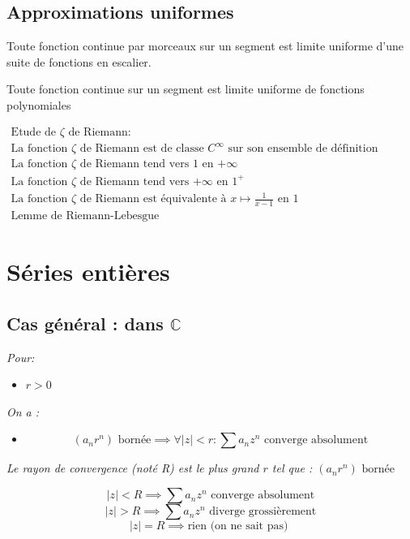 \documentclass[a4paper,12pt]{report}
\newcommand{\Thm}[2]{\begin{tcolorbox}[colback=white,colframe=Red!60, title=Théorème : #1]#2\end{tcolorbox}}
\newcommand{\Methode}[2]{\begin{tcolorbox}[colback=white, title=Méthode :  #1]#2\end{tcolorbox}}
\def\C{\mathbb{C}}
\begin{document}
\subsection{Approximations uniformes}
\Thm{Approximation uniforme (segment)}{
 Toute fonction continue par morceaux sur un segment est limite uniforme d’une suite de fonctions
 en escalier.
}

\Thm{de Weierstrass (segment)}{
 Toute fonction continue sur un segment est limite
 uniforme de fonctions polynomiales
}

\Methode{Ce qu'il faut savoir faire}{
    \(
    \begin{array}{l}
         \text{Etude de $\zeta$ de Riemann:}\\
         \text{La fonction $\zeta$ de Riemann est de classe $C^\infty$ sur son ensemble de définition}\\
         \text{La fonction $\zeta$ de Riemann tend vers 1 en $+\infty$}\\
         \text{La fonction $\zeta$ de Riemann tend vers $+\infty$ en $1^+$}\\
         \text{La fonction $\zeta$ de Riemann est équivalente à  $x\longmapsto\frac{1}{x-1}$ en $1$}\\
         \text{Lemme de Riemann-Lebesgue}
    \end{array}
    \)
}


\section{Séries entières}
\subsection{Cas général : dans $\C$}
\Thm{Lemme d'Abel}{
\textit{Pour:}
\begin{itemize}
  \item[] \(r>0\)
\end{itemize}
\textit{On a :}
\begin{itemize}
    \item[] \[(a_nr^n) \text{ bornée} \implies \forall |z|<r : \sum a_nz^n \text{ converge absolument}\]
\end{itemize}
\textit{Le rayon de convergence (noté R) est le plus grand $r$ tel que : $(a_nr^n) \text{ bornée}$}
}

\Thm{Implication du RCV sur la série}{
    \[|z|<R \implies \sum a_nz^n \text{ converge absolument}\]
    \[|z|>R \implies \sum a_nz^n \text{ diverge grossièrement}\]
    \[|z|=R \implies \text{rien (on ne sait pas) }\]
}
\end{document}
